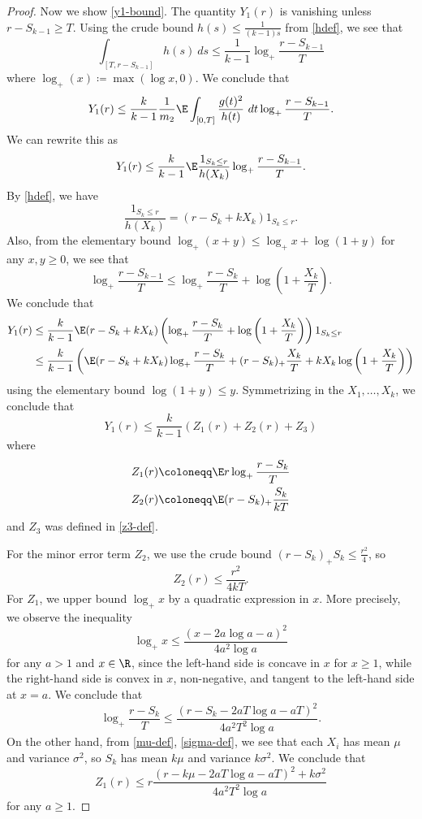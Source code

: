 \begin{proof}
Now we show \eqref{y1-bound}.  The quantity $Y_1(r)$ is vanishing unless $r-S_{k-1} \geq T$.  Using the crude bound $h(s) \leq \frac{1}{(k-1)s}$ from \eqref{hdef}, we see that
$$ \int_{[T,r-S_{k-1}]} h(s)\ ds \leq \frac{1}{k-1} \log_+ \frac{r-S_{k-1}}{T}$$
where $\log_+(x) \coloneqq \max(\log x, 0)$.  We conclude that
$$ Y_1(r) \leq \frac{k}{k-1} \frac{1}{m_2} \E \int_{[0,T]} \frac{g(t)^2}{h(t)}\ dt \log_+ \frac{r-S_{k-1}}{T}.$$
We can rewrite this as
$$ Y_1(r) \leq \frac{k}{k-1} \E \frac{1_{S_k \leq r}}{h(X_k)} \log_+ \frac{r-S_{k-1}}{T}.$$
By \eqref{hdef}, we have
$$ \frac{1_{S_k \leq r}}{h(X_k)} = (r-S_k+kX_k) 1_{S_k \leq r}.$$
Also, from the elementary bound $\log_+(x+y) \leq \log_+ x + \log(1+y)$ for any $x,y \geq 0$, we see that
$$ \log_+ \frac{r-S_{k-1}}{T} \leq \log_+ \frac{r-S_{k}}{T} + \log\left(1+\frac{X_k}{T}\right).$$
We conclude that
\begin{align*}
Y_1(r) &\leq \frac{k}{k-1} \E (r-S_k+kX_k) \left( \log_+ \frac{r-S_{k}}{T} + \log\left(1+\frac{X_k}{T}\right) \right) 1_{S_k \leq r}\\
&\leq \frac{k}{k-1} \left( \E (r-S_k+kX_k) \log_+ \frac{r-S_{k}}{T} + (r-S_k)_+ \frac{X_k}{T} + k X_k \log\left(1+\frac{X_k}{T}\right) \right)
\end{align*}
using the elementary bound $\log(1+y) \leq y$.  Symmetrizing in the $X_1,\dots,X_k$, we conclude that
\begin{equation}\label{y1r}
 Y_1(r) \leq \frac{k}{k-1} (Z_1(r) + Z_2(r) + Z_3)
\end{equation}
where
\begin{align*}
Z_1(r) &\coloneqq \E r \log_+ \frac{r-S_k}{T} \\
Z_2(r) &\coloneqq \E (r-S_k)_+ \frac{S_k}{kT} 
\end{align*}
and $Z_3$ was defined in \eqref{z3-def}.

For the minor error term $Z_2$, we use the crude bound $(r-S_k)_+ S_k \leq \frac{r^2}{4}$, so
\begin{equation}\label{z2r}
Z_2(r) \leq \frac{r^2}{4kT}.
\end{equation}
For $Z_1$, we upper bound $\log_+ x$ by a quadratic expression in $x$.  More precisely, we observe the inequality
$$ \log_+ x \leq \frac{(x-2a\log a-a)^2}{4a^2 \log a}$$
for any $a > 1$ and $x \in \R$, since the left-hand side is concave in $x$ for $x \geq 1$, while the right-hand side is convex in $x$, non-negative, and tangent to the left-hand side at $x=a$.  We conclude that
$$ \log_+ \frac{r-S_k}{T} \leq \frac{(r-S_k-2aT\log a-aT)^2}{4a^2 T^2 \log a}.$$
On the other hand, from \eqref{mu-def}, \eqref{sigma-def}, we see that each $X_i$ has mean $\mu$ and variance $\sigma^2$, so $S_k$ has mean $k\mu$ and variance $k\sigma^2$.  We conclude that
$$ Z_1(r) \leq r \frac{ (r-k\mu-2aT\log a-aT)^2 + k \sigma^2}{4a^2 T^2 \log a}$$
for any $a \geq 1$.


\end{proof}
